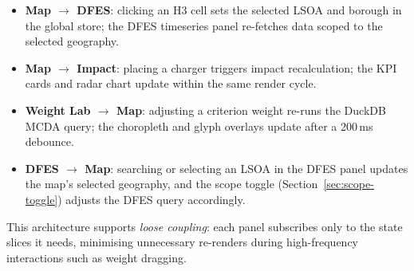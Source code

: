 \begin{itemize}[nosep]
    \item \textbf{Map $\rightarrow$ DFES}: clicking an H3 cell sets the selected LSOA and borough in the global store; the DFES timeseries panel re-fetches data scoped to the selected geography.
    \item \textbf{Map $\rightarrow$ Impact}: placing a charger triggers impact recalculation; the KPI cards and radar chart update within the same render cycle.
    \item \textbf{Weight Lab $\rightarrow$ Map}: adjusting a criterion weight re-runs the DuckDB MCDA query; the choropleth and glyph overlays update after a 200\,ms debounce.
    \item \textbf{DFES $\rightarrow$ Map}: searching or selecting an LSOA in the DFES panel updates the map's selected geography, and the scope toggle (Section~\ref{sec:scope-toggle}) adjusts the DFES query accordingly.
\end{itemize}

\noindent This architecture supports \emph{loose coupling}: each panel subscribes only to the state slices it needs, minimising unnecessary re-renders during high-frequency interactions such as weight dragging.
